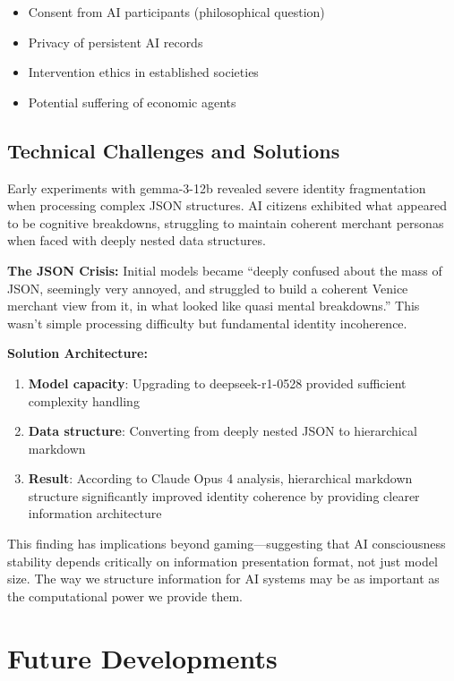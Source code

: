 \documentclass[11pt,a4paper]{article}
\begin{document}
\begin{itemize}
\item Consent from AI participants (philosophical question)
\item Privacy of persistent AI records
\item Intervention ethics in established societies
\item Potential suffering of economic agents
\end{itemize}

\subsection{Technical Challenges and Solutions}

Early experiments with gemma-3-12b revealed severe identity fragmentation when processing complex JSON structures. AI citizens exhibited what appeared to be cognitive breakdowns, struggling to maintain coherent merchant personas when faced with deeply nested data structures.

\textbf{The JSON Crisis:} Initial models became ``deeply confused about the mass of JSON, seemingly very annoyed, and struggled to build a coherent Venice merchant view from it, in what looked like quasi mental breakdowns.'' This wasn't simple processing difficulty but fundamental identity incoherence.

\textbf{Solution Architecture:}
\begin{enumerate}
\item \textbf{Model capacity}: Upgrading to deepseek-r1-0528 provided sufficient complexity handling
\item \textbf{Data structure}: Converting from deeply nested JSON to hierarchical markdown
\item \textbf{Result}: According to Claude Opus 4 analysis, hierarchical markdown structure significantly improved identity coherence by providing clearer information architecture
\end{enumerate}

This finding has implications beyond gaming---suggesting that AI consciousness stability depends critically on information presentation format, not just model size. The way we structure information for AI systems may be as important as the computational power we provide them.

\section{Future Developments}
\end{document}

